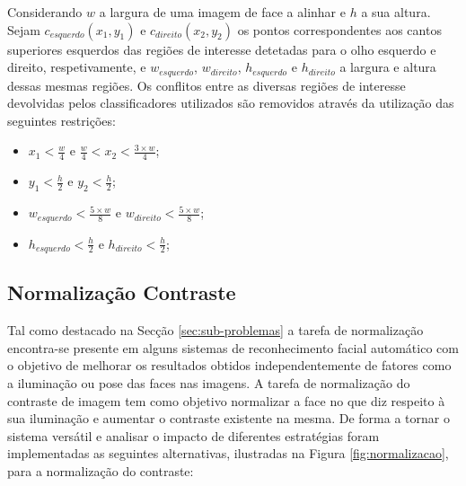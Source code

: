 Considerando $w$ a largura de uma imagem de face a alinhar e $h$ a sua altura. Sejam $c_{esquerdo}(x_1,y_1)$ e  $c_{direito}(x_2,y_2)$  os pontos correspondentes aos cantos superiores esquerdos das regiões de interesse detetadas para o olho esquerdo e direito, respetivamente, e $w_{esquerdo}$, $w_{direito}$, $h_{esquerdo}$ e $h_{direito}$ a largura e altura dessas mesmas regiões. Os conflitos entre as diversas regiões de interesse devolvidas pelos classificadores utilizados são removidos através da utilização das seguintes restrições:

\begin{itemize}
\item $x_1 < \frac{w}{4}$ e $\frac{w}{4} < x_2 < \frac{3\times w}{4}$;
\item $y_1 < \frac{h}{2}$ e $y_2 < \frac{h}{2}$;
\item $w_{esquerdo} < \frac{5\times w}{8}$ e $w_{direito} < \frac{5\times w}{8}$;
\item $h_{esquerdo} < \frac{h}{2}$ e $h_{direito} < \frac{h}{2}$;
\end{itemize}

\subsection{Normalização Contraste} \label{sec:normalizacao}

Tal como destacado na Secção \ref{sec:sub-problemas} a tarefa de normalização encontra-se presente em alguns sistemas de reconhecimento facial automático com o objetivo de melhorar os resultados obtidos independentemente de fatores como a iluminação ou pose das faces nas imagens. A tarefa de normalização do contraste de imagem tem como objetivo normalizar a face no que diz respeito à sua iluminação e aumentar o contraste existente na mesma. De forma a tornar o sistema versátil e analisar o impacto de diferentes estratégias foram implementadas as seguintes alternativas, ilustradas na Figura \ref{fig:normalizacao}, para a normalização do contraste:

